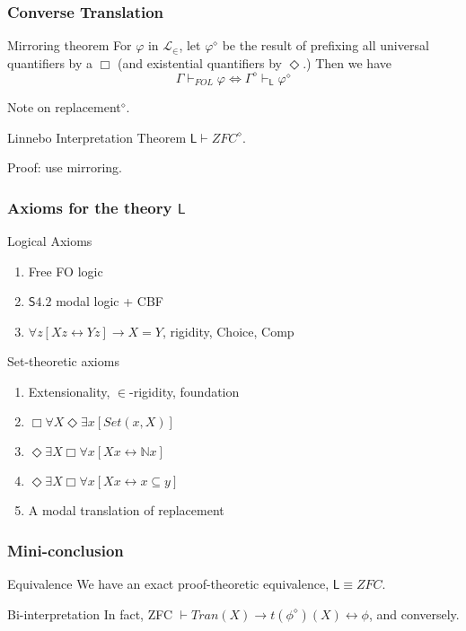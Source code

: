 \documentclass[handout]{beamer}
\begin{document}
\begin{frame}
    \frametitle{Converse Translation}
\begin{block}{Mirroring theorem}
 For $\varphi$ in $\mathcal{L}_\in$, let $\varphi^\diamond$ be the result of 
prefixing all universal quantifiers by a $\Box$ 
(and existential quantifiers by $\Diamond$.) Then we have 
\[
    \Gamma \vdash_{FOL} \varphi 
    \Leftrightarrow 
    \Gamma^\diamond \vdash_{\mathsf{L}} \varphi^\diamond
\]
\end{block}
 Note on replacement$^\diamond$.
\begin{block}{Linnebo Interpretation Theorem}
  $\mathsf{L} \vdash ZFC^\diamond$.  
\end{block}
 Proof: use mirroring.
\end{frame}
\begin{frame}
    \frametitle{Axioms for the theory $\mathsf{L}$}
    \begin{block}{Logical Axioms}
    \begin{enumerate}
        \item Free FO logic
        \item $\mathsf{S4.2}$ modal logic + CBF
        \item $\forall z[Xz \leftrightarrow Yz] \rightarrow X = Y$, rigidity,
        Choice, Comp
    \end{enumerate}
    \end{block}
    \begin{block}{Set-theoretic axioms}
        \begin{enumerate}
        \item Extensionality, $\in$-rigidity, foundation
        \item $\Box \forall X \Diamond \exists x [Set(x, X)]$
        \item $\Diamond \exists X \Box \forall x[Xx \leftrightarrow \mathbb{N}x]$
        \item $\Diamond \exists X \Box \forall x[Xx \leftrightarrow x \subseteq y]$
        \item A modal translation of replacement
        \end{enumerate}
    \end{block}
\end{frame}

\begin{frame}
    \frametitle{Mini-conclusion}
\begin{block}{Equivalence}
    We have an exact proof-theoretic equivalence, $\mathsf{L} \equiv ZFC$.
\end{block}
\begin{block}{Bi-interpretation}
    In fact, ZFC $\vdash Tran(X) \rightarrow t(\phi^\diamond)(X) \leftrightarrow \phi$, and conversely.
\end{block}
\end{frame}
\end{document}
